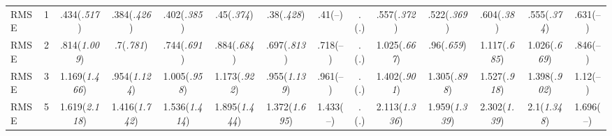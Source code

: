 \documentclass{article}
\begin{document}
\begin{table}[tbp]
{\begin{tabularx}{\textwidth}{lCCCCCCCCCCCCC}
RMSE&1&.434\newline (\emph{.517})&.384\newline (\emph{.426})&.402\newline (\emph{.385})&.45\newline (\emph{.374})&.38\newline (\emph{.428})&.41\newline (--)&.\newline (\emph{.})&.557\newline (\emph{.372})&.522\newline (\emph{.369})&.604\newline (\emph{.38})&.555\newline (\emph{.374})&.631\newline (--) \tabularnewline
RMSE&2&.814\newline (\emph{1.009})&.7\newline (\emph{.781})&.744\newline (\emph{.691})&.884\newline (\emph{.684})&.697\newline (\emph{.813})&.718\newline (--)&.\newline (\emph{.})&1.025\newline (\emph{.667})&.96\newline (\emph{.659})&1.117\newline (\emph{.685})&1.026\newline (\emph{.669})&.846\newline (--) \tabularnewline
RMSE&3&1.169\newline (\emph{1.466})&.954\newline (\emph{1.124})&1.005\newline (\emph{.958})&1.173\newline (\emph{.922})&.955\newline (\emph{1.139})&.961\newline (--)&.\newline (\emph{.})&1.402\newline (\emph{.901})&1.305\newline (\emph{.898})&1.527\newline (\emph{.918})&1.398\newline (\emph{.902})&1.12\newline (--) \tabularnewline
RMSE&5&1.619\newline (\emph{2.118})&1.416\newline (\emph{1.742})&1.536\newline (\emph{1.414})&1.895\newline (\emph{1.444})&1.372\newline (\emph{1.695})&1.433\newline (--)&.\newline (\emph{.})&2.113\newline (\emph{1.336})&1.959\newline (\emph{1.339})&2.302\newline (\emph{1.39})&2.1\newline (\emph{1.348})&1.696\newline (--) \tabularnewline

\end{tabularx}}
\end{table}
\end{document}

